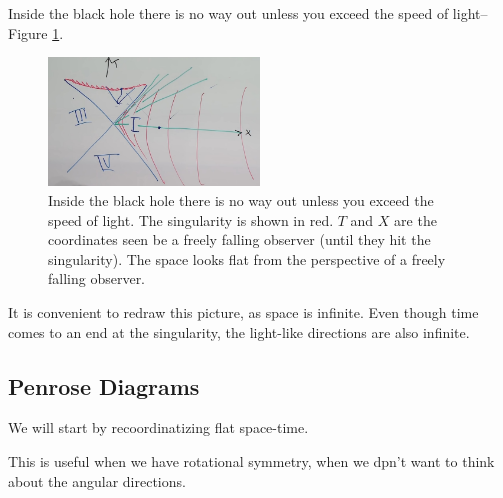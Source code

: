 \documentclass[]{article}
\begin{document}
{Inside the black hole there is no way out unless you exceed the speed of light--Figure \ref{fig:gr-8-quadrant1}.

\begin{figure}[H]
	\begin{center}
		\caption[Inside the black hole ]{Inside the black hole there is no way out unless you exceed the speed of light. The singularity is shown in red. $T$ and $X$ are the coordinates seen be a freely falling observer (until they hit the singularity). The space looks flat from the perspective of a freely falling observer.}\label{fig:gr-8-quadrant1}
		\includegraphics[width=0.5\textwidth]{gr-8-quadrant1}
	\end{center}
\end{figure}

It is convenient to redraw this picture, as space is infinite. Even though time comes to an end at the singularity, the light-like directions are also infinite.

\subsection{Penrose Diagrams}
We will start by recoordinatizing flat space-time.

This is useful when we have rotational symmetry, when we dpn't want to think about the angular directions.

}
\end{document}
